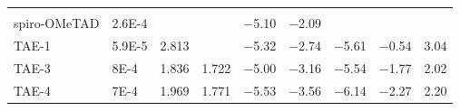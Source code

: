 \begin{table}
\begin{xltabular}[c]{1.05\linewidth}{@{} >{\hsize}Y | >{\hsize}Y >{\hsize}Y >{\hsize}Y >{\hsize}Y >{\hsize}Y >{\hsize}Y >{\hsize}Y Y @{}}
			\hline
			\endhead
			\hline
			\\
			\endfoot
			\hline
			\endlastfoot
			\rule[-1ex]{0pt}{3ex}
			spiro-OMeTAD 		& \num{2.6E-4} 	& 				& 					& \num{-5.10}	& \num{-2.09}	& 				&  				& \\
			TAE-1				& \num{5.9E-5} 	& \num{2.813}	& 					& \num{-5.32}	& \num{-2.74}	& \num{-5.61}	& \num{-0.54}	& \num{3.04} \\
			TAE-3 				& \num{8E-4} 	& \num{1.836}	& \num{1.722}		& \num{-5.00}	& \num{-3.16}	& \num{-5.54}	& \num{-1.77}	& \num{2.02} \\
			TAE-4 				& \num{7E-4} 	& \num{1.969}	& \num{1.771}		& \num{-5.53}	& \num{-3.56}	& \num{-6.14}	& \num{-2.27}	& \num{2.20} \\
		\end{xltabular}
	\end{table}

